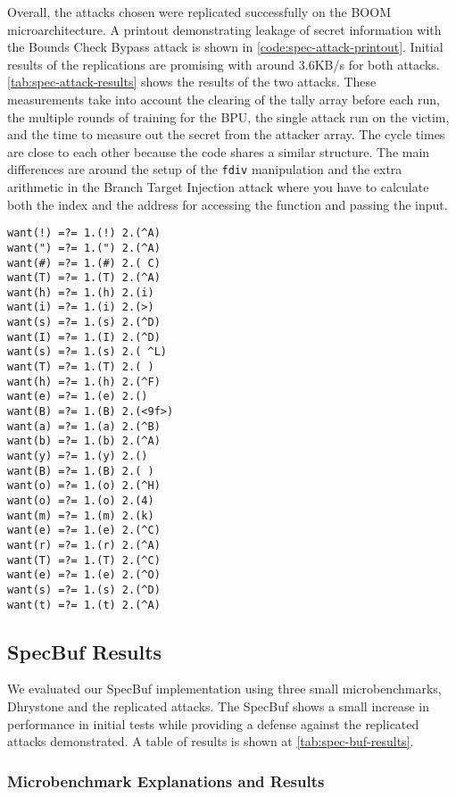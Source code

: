 Overall, the attacks chosen were replicated successfully on the BOOM microarchitecture. A printout
demonstrating leakage of secret information with the Bounds Check Bypass attack
is shown in \ref{code:spec-attack-printout}. Initial results of the replications
are promising with around 3.6KB/s for both attacks. \ref{tab:spec-attack-results}
shows the results of the two attacks. These measurements take into account the clearing
of the tally array before each run, the multiple rounds of training for the BPU,
the single attack run on the victim, and the time to measure out the secret from the attacker array.
The cycle times are close to each other because the code shares a similar structure. The main
differences are around the setup of the {\tt fdiv} manipulation
and the extra arithmetic in the Branch Target Injection attack where you have to calculate
both the index and the address for accessing the function and passing the input. 

\begin{lstlisting}[style=column-code, caption=Printout of Bounds Check Bypass Attack]
want(!) =?= 1.(!) 2.(^A)
want(") =?= 1.(") 2.(^A)
want(#) =?= 1.(#) 2.( C)
want(T) =?= 1.(T) 2.(^A)
want(h) =?= 1.(h) 2.(i)
want(i) =?= 1.(i) 2.(>)
want(s) =?= 1.(s) 2.(^D)
want(I) =?= 1.(I) 2.(^D)
want(s) =?= 1.(s) 2.( ^L)
want(T) =?= 1.(T) 2.( )
want(h) =?= 1.(h) 2.(^F)
want(e) =?= 1.(e) 2.()
want(B) =?= 1.(B) 2.(<9f>)
want(a) =?= 1.(a) 2.(^B)
want(b) =?= 1.(b) 2.(^A)
want(y) =?= 1.(y) 2.()
want(B) =?= 1.(B) 2.( )
want(o) =?= 1.(o) 2.(^H)
want(o) =?= 1.(o) 2.(4)
want(m) =?= 1.(m) 2.(k)
want(e) =?= 1.(e) 2.(^C)
want(r) =?= 1.(r) 2.(^A)
want(T) =?= 1.(T) 2.(^C)
want(e) =?= 1.(e) 2.(^O)
want(s) =?= 1.(s) 2.(^D)
want(t) =?= 1.(t) 2.(^A)
\end{lstlisting}
\label{code:spec-attack-printout}

\subsection{SpecBuf Results}

We evaluated our SpecBuf implementation using three small microbenchmarks, Dhrystone and the 
replicated attacks. The SpecBuf shows a small increase in performance in initial tests while providing
a defense against the replicated attacks demonstrated. A table of results is shown at \ref{tab:spec-buf-results}.

\subsubsection{Microbenchmark Explanations and Results}

